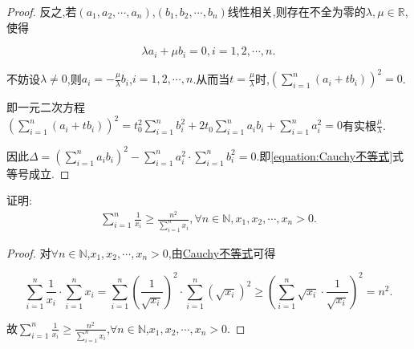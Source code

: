 \documentclass[../../main.tex]{subfiles}
\begin{document}
\begin{proof}
反之,若\((a_1,a_2,\cdots,a_n)\),\((b_1,b_2,\cdots,b_n)\)线性相关,则存在不全为零的\(\lambda,\mu \in \mathbb{R}\),使得

\[
\lambda a_i + \mu b_i = 0,  i = 1,2,\cdots,n.
\]

不妨设\(\lambda \neq 0\),则\(a_i = -\frac{\mu}{\lambda}b_i\),\(i = 1,2,\cdots,n\).从而当\(t = \frac{\mu}{\lambda}\)时,\(\left(\sum\limits_{i = 1}^{n}(a_i + tb_i)\right)^2 = 0\).

即一元二次方程\(\left(\sum\limits_{i = 1}^{n}(a_i + tb_i)\right)^2 = t_{0}^{2}\sum\limits_{i = 1}^{n}b_{i}^{2} + 2t_0\sum\limits_{i = 1}^{n}a_ib_i + \sum\limits_{i = 1}^{n}a_{i}^{2} = 0\)有实根\(\frac{\mu}{\lambda}\).

因此\(\Delta = \left(\sum\limits_{i = 1}^{n}a_ib_i\right)^2 - \sum\limits_{i = 1}^{n}a_{i}^{2} \cdot \sum\limits_{i = 1}^{n}b_{i}^{2} = 0\).即\eqref{equation:Cauchy不等式}式等号成立.
\end{proof}

\begin{example}
证明:\begin{align*}
\sum\limits_{i=1}^n{\frac{1}{x_i}}\geqslant \frac{n^2}{\sum\limits_{i=1}^n{x_i}},\forall n\in \mathbb{N} ,x_1,x_2,\cdots ,x_n>0.
\end{align*}
\end{example}
\begin{proof}
对\(\forall n \in \mathbb{N}\),\(x_1,x_2,\cdots,x_n > 0\),由\hyperref[theorem:Cauchy不等式]{Cauchy不等式}可得

\[
\sum\limits_{i = 1}^{n}\frac{1}{x_i} \cdot \sum\limits_{i = 1}^{n}x_i = \sum\limits_{i = 1}^{n}\left(\frac{1}{\sqrt{x_i}}\right)^2 \cdot \sum\limits_{i = 1}^{n}\left(\sqrt{x_i}\right)^2 \geqslant \left(\sum\limits_{i = 1}^{n}\sqrt{x_i} \cdot \frac{1}{\sqrt{x_i}}\right)^2 = n^2.
\]

故\(\sum\limits_{i = 1}^{n}\frac{1}{x_i} \geqslant \frac{n^2}{\sum\limits_{i = 1}^{n}x_i}\),\(\forall n \in \mathbb{N}\),\(x_1,x_2,\cdots,x_n > 0\). 
\end{proof}
\end{document}

